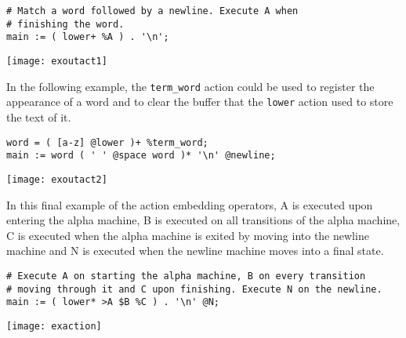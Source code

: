 \documentclass[letterpaper,11pt,oneside]{book}
\newcommand{\graphspace}{\vspace{10pt}}
\newenvironment{inline_code}{\def\baselinestretch{1}\vspace{12pt}\small}{}
\begin{document}
\begin{inline_code}
\begin{verbatim}
# Match a word followed by a newline. Execute A when 
# finishing the word.
main := ( lower+ %A ) . '\n';
\end{verbatim}
\end{inline_code}

\graphspace
\begin{center}
\texttt{[image: exoutact1]}
\end{center}
\graphspace

In the following example, the \verb|term_word| action could be used to register
the appearance of a word and to clear the buffer that the \verb|lower| action used
to store the text of it.

\begin{inline_code}
\begin{verbatim}
word = ( [a-z] @lower )+ %term_word;
main := word ( ' ' @space word )* '\n' @newline;
\end{verbatim}
\end{inline_code}

\graphspace
\begin{center}
\texttt{[image: exoutact2]}
\end{center}
\graphspace

In this final example of the action embedding operators, A is executed upon entering
the alpha machine, B is executed on all transitions of the
alpha machine, C is executed when the alpha machine is exited by moving into the
newline machine and N is executed when the newline machine moves into a final
state.  

\begin{inline_code}
\begin{verbatim}
# Execute A on starting the alpha machine, B on every transition 
# moving through it and C upon finishing. Execute N on the newline.
main := ( lower* >A $B %C ) . '\n' @N;
\end{verbatim}
\end{inline_code}

\graphspace
\begin{center}
\texttt{[image: exaction]}
\end{center}
\graphspace
\end{document}
